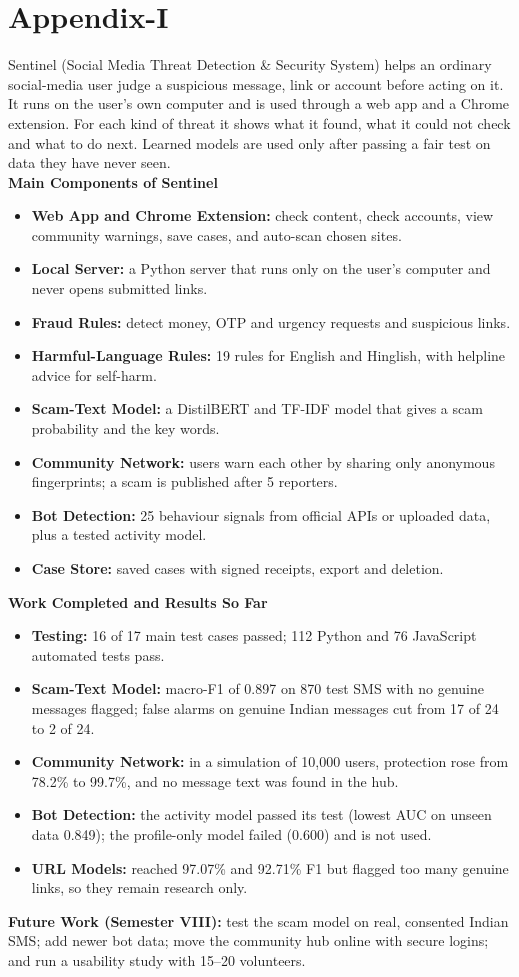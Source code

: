 \newpage
\chapter*{Appendix-I}
\onehalfspacing
\pagestyle{fancy}
\fancyhf{}
\renewcommand{\headrulewidth}{0pt}
\cfoot{\thepage}
\noindent Sentinel (Social Media Threat Detection \& Security System) helps an ordinary social-media user judge a suspicious message, link or account before acting on it. It runs on the user's own computer and is used through a web app and a Chrome extension. For each kind of threat it shows what it found, what it could not check and what to do next. Learned models are used only after passing a fair test on data they have never seen.\\

\noindent\textbf{Main Components of Sentinel}
\begin{itemize}
\item \textbf{Web App and Chrome Extension:} check content, check accounts, view community warnings, save cases, and auto-scan chosen sites.
\item \textbf{Local Server:} a Python server that runs only on the user's computer and never opens submitted links.
\item \textbf{Fraud Rules:} detect money, OTP and urgency requests and suspicious links.
\item \textbf{Harmful-Language Rules:} 19 rules for English and Hinglish, with helpline advice for self-harm.
\item \textbf{Scam-Text Model:} a DistilBERT and TF-IDF model that gives a scam probability and the key words.
\item \textbf{Community Network:} users warn each other by sharing only anonymous fingerprints; a scam is published after 5 reporters.
\item \textbf{Bot Detection:} 25 behaviour signals from official APIs or uploaded data, plus a tested activity model.
\item \textbf{Case Store:} saved cases with signed receipts, export and deletion.
\end{itemize}

\noindent\textbf{Work Completed and Results So Far}
\begin{itemize}
\item \textbf{Testing:} 16 of 17 main test cases passed; 112 Python and 76 JavaScript automated tests pass.
\item \textbf{Scam-Text Model:} macro-F1 of 0.897 on 870 test SMS with no genuine messages flagged; false alarms on genuine Indian messages cut from 17 of 24 to 2 of 24.
\item \textbf{Community Network:} in a simulation of 10,000 users, protection rose from 78.2\% to 99.7\%, and no message text was found in the hub.
\item \textbf{Bot Detection:} the activity model passed its test (lowest AUC on unseen data 0.849); the profile-only model failed (0.600) and is not used.
\item \textbf{URL Models:} reached 97.07\% and 92.71\% F1 but flagged too many genuine links, so they remain research only.
\end{itemize}

\noindent\textbf{Future Work (Semester VIII):} test the scam model on real, consented Indian SMS; add newer bot data; move the community hub online with secure logins; and run a usability study with 15--20 volunteers.

